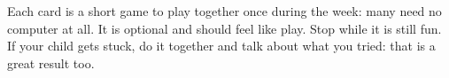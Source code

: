 \documentclass[track=junior,level=3]{kidscode}
\begin{document}

\begin{grownup}
Each card is a short game to play together once during the week: many need no computer at all.
It is optional and should feel like play. Stop while it is still fun. If your child gets stuck,
do it together and talk about what you tried: that is a great result too.
\end{grownup}
\kcweeklytoc
{}
\end{document}
